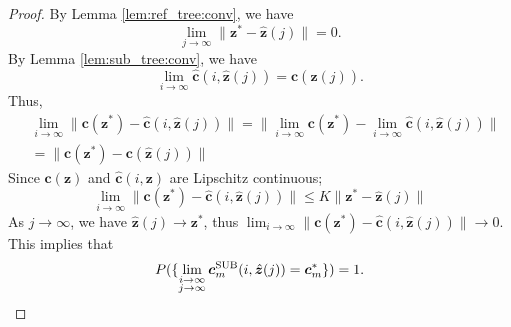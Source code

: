 \documentclass{article}
\begin{document}
\begin{proof}

By Lemma \ref{lem:ref_tree:conv}, we have 
\begin{equation}
\lim_{j \to \infty} \lVert \bm{z}^{*} - \hat{\bm{z}} (j) \rVert = 0.
\end{equation}
By Lemma \ref{lem:sub_tree:conv}, we have
\begin{equation}
\lim_{i \to \infty} \hat{\bm{c}}( i, \hat{\bm{z}}(j) ) = \bm{c}( \hat{\bm{z}}(j) ).
\end{equation}
Thus,
\begin{equation}
\nonumber
\begin{aligned}
& \lim_{i \to \infty} \lVert \bm{c}( \bm{z}^{*} ) -  \hat{\bm{c}}( i, \hat{\bm{z}}(j) ) \rVert 
= \lVert \lim_{i \to \infty} \bm{c}( \bm{z}^{*} ) - \lim_{i \to \infty} \hat{\bm{c}}( i, \hat{\bm{z}}(j) ) \rVert \\
& =  \lVert \bm{c}( \bm{z}^{*} ) - \bm{c}( \hat{\bm{z}}(j) ) \rVert 
\end{aligned}
\end{equation}
Since $ \bm{c}( \bm{z} ) $ and $ \hat{\bm{c}}( i, \bm{z} ) $
are Lipschitz continuous;
\begin{equation}
\lim_{i \to \infty} \lVert \bm{c}( \bm{z}^{*} ) -  \hat{\bm{c}}( i, \hat{\bm{z}}(j) ) \rVert \leq K \lVert \bm{z}^{*} - \hat{\bm{z}}(j) \rVert
\end{equation}
As $ j \to \infty $, we have $ \hat{\bm{z}}(j) \to \bm{z}^{*} $, thus $ \lim_{i \to \infty} \lVert \bm{c}( \bm{z}^{*} ) -  \hat{\bm{c}}( i, \hat{\bm{z}}(j) ) \rVert \to 0 $.
This implies that
\begin{equation}
P( \{ \lim_{ \substack{ i \to \infty \\ j \to \infty } } \bm{c}^{\rm SUB}_{m} (i , \hat{\bm{z}} (j) ) =  \bm{c}_{m}^{*}  \} ) = 1 .
\end{equation}
\end{proof}
\end{document}
